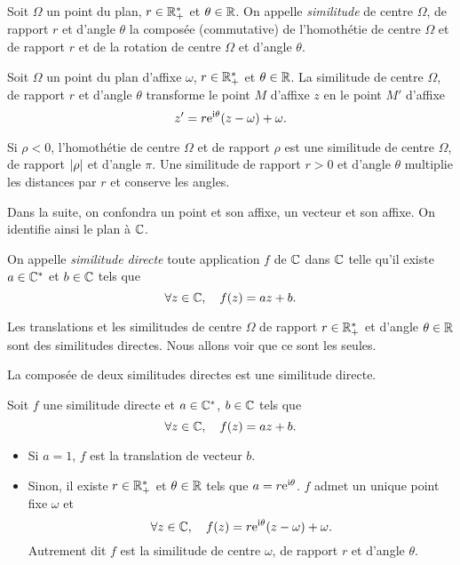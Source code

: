 \documentclass{magnoliaold}
\begin{document}
\begin{definition}[utile=-3]
Soit $\Omega$ un point du plan, $r\in\mathbb{R}_+^*$ et $\theta\in\mathbb{R}$. On appelle \emph{similitude} de centre $\Omega$, de rapport $r$ et d'angle $\theta$ la composée (commutative) de l'homothétie de centre $\Omega$ et de rapport $r$ et de la rotation de centre $\Omega$ et d'angle $\theta$.
\end{definition}

\begin{proposition}[utile=-3]
Soit $\Omega$ un point du plan d'affixe $\omega$, $r\in\mathbb{R}_+^*$ et $\theta\in\mathbb{R}$. La similitude de centre $\Omega$, de rapport $r$ et d'angle $\theta$ transforme le point $M$ d'affixe $z$ en le point $M'$ d'affixe
\[z'=r{\rm e}^{{\rm i}\theta}(z-\omega)+\omega.\]
\end{proposition}

\begin{remarques}
\remarque Si $\rho<0$, l'homothétie de centre $\Omega$ et de rapport $\rho$ est
  une similitude de centre $\Omega$, de rapport $\left|\rho\right|$ et d'angle $\pi$.
\remarque Une similitude de rapport $r>0$ et d'angle $\theta$ multiplie les distances par
  $r$ et conserve les angles.
\end{remarques}

Dans la suite, on confondra un point et son affixe, un vecteur et son affixe. On identifie ainsi le plan à $\mathbb{C}$.

\begin{definition}
On appelle \emph{similitude directe} toute application $f$ de $\mathbb{C}$ dans $\mathbb{C}$ telle qu'il existe $a\in\mathbb{C}^*$ et $b\in\mathbb{C}$ tels que
\[\forall z\in\mathbb{C},\quad f(z)=az+b.\]
\end{definition}

\begin{remarqueUnique}
\remarque Les translations et les similitudes de centre $\Omega$ de rapport $r\in\mathbb{R}_+^*$ et d'angle $\theta\in\mathbb{R}$ sont des similitudes directes. Nous allons voir que ce sont les seules.
\end{remarqueUnique}

\begin{proposition}
La composée de deux similitudes directes est une similitude directe.
\end{proposition}

\begin{proposition}
Soit $f$ une similitude directe et $a\in\mathbb{C}^*$, $b\in\mathbb{C}$ tels que
\[\forall z\in\mathbb{C},\quad f(z)=az+b.\]
\begin{itemize}
\item Si $a=1$, $f$ est la translation de vecteur $b$.
\item Sinon, il existe $r\in\mathbb{R}_+^*$ et $\theta\in\mathbb{R}$ tels que $a=r{\rm e}^{{\rm i}\theta}$. $f$ admet un unique point fixe $\omega$ et
\[\forall z\in\mathbb{C},\quad f(z)=r{\rm e}^{{\rm i}\theta}(z-\omega)+\omega.\]
Autrement dit $f$ est la similitude de centre $\omega$, de rapport $r$ et d'angle $\theta$.
\end{itemize}
\end{proposition}
\end{document}
